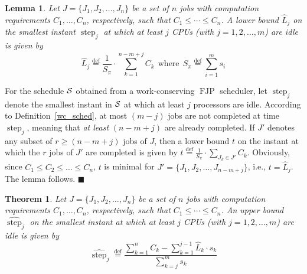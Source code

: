 \documentclass[10pt,english,a4paper]{article}
\newcommand{\ds}{\displaystyle}
\newcommand{\equals}{\stackrel{\mathrm{def}}{=}}
\newtheorem{theorem}{Theorem}
\newtheorem{lemma}{Lemma}
\newenvironment{proof}[1][Proof]{\begin{trivlist}
\item[\hskip \labelsep {\bfseries #1}]}{\end{trivlist}}
\newtheorem{validity test}{Validity Test}
\newcommand{\FJP}{\operatorname{FJP}}
\newcommand{\step}{\widehat{\operatorname{step}}}
\newcommand{\minstep}{\operatorname{step}}
\newcommand{\fin}{\hfill{\small $\blacksquare$}}     \newcommand{\oh}[1]{\ensuremath{\mathcal{0}{(#1)}}} \def\thefootnote{\arabic{footnote}}
\begin{document}
\begin{lemma}\label{earliest tidle}
Let $J = \{J_1, J_2, \ldots, J_n\}$ be a set of $n$ jobs with computation requirements $C_1, \ldots, C_n$, respectively, such that $C_1 \le \cdots \le C_n$. A lower bound $\hat{L}_j$ on the smallest instant $\minstep_j$ at which at least $j$ CPUs (with $j = 1, 2, \ldots, m$) are idle is given by
\begin{equation}
\hat{L}_j \equals \ds\frac{1}{S_{\pi}} \cdot \ds\sum_{k=1}^{n-m+j} C_k \:\: \mbox{where} \:\: S_{\pi} \equals \ds\sum_{i=1}^{m} s_i
\end{equation}
\end{lemma}

\begin{proof}
For the schedule ${\cal S}$ obtained from a work-conserving $\FJP$ scheduler, let $\minstep_j$ denote the smallest instant in ${\cal S}$ at which at least $j$ processors are idle. According to Definition~\ref{wc_sched}, at most $(m-j)$ jobs are not completed at time $\minstep_j$, meaning that \emph{at least} $(n - m + j)$ are already completed. If $J'$ denotes any subset of $r \geq (n - m + j)$ jobs of $J$, then a lower bound $t$ on the instant at which the $r$ jobs of $J'$ are completed is given by $t \equals \ds\frac{1}{S_{\pi}} \cdot \ds\sum_{J_k \in J'} C_k$. Obviously, since $C_1 \leq C_2 \leq \ldots \leq C_n$, $t$ is minimal for $J' = \{ J_1, J_2, \ldots, J_{n - m + j}\}$, i.e., $t =  \hat{L}_j$. The lemma follows. \fin
\end{proof}

\begin{theorem}\label{latest tidle}
Let $J = \{J_1, J_2, \ldots, J_n\}$ be a set of $n$ jobs with computation requirements $C_1, \ldots, C_n$, respectively, such that $C_1 \le \cdots \le C_n$. An {\em upper bound} $\step_j$ on the smallest instant at which at least $j$ CPUs (with $j = 1, 2, \ldots, m$) are idle is given by
\begin{equation}
\step_j \equals \frac{\sum_{k=1}^{n} C_k - \sum_{k=1}^{j-1} \hat{L}_k \cdot s_k}{\sum_{k=j}^m s_k}
\end{equation}
\end{theorem}
\end{document}
